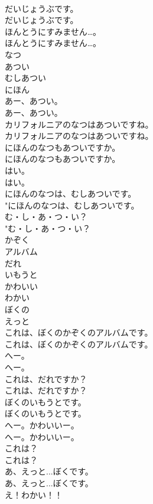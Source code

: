 \documentclass[8pt]{extreport}
\begin{document}
\begin{CJK}{UTF8}{min}
\\	だいじょうぶです。	
\\	だいじょうぶです。 
\\	ほんとうにすみません…。	
\\	ほんとうにすみません…。 
\\	なつ
\\	あつい
\\	むしあつい
\\	にほん
\\	あー、あつい。	
\\	あー、あつい。 
\\	カリフォルニアのなつはあついですね。	
\\	カリフォルニアのなつはあついですね。 
\\	にほんのなつもあついですか。	
\\	にほんのなつもあついですか。 
\\	はい。	
\\	はい。 
\\	にほんのなつは、むしあついです。	
\\	"にほんのなつは、むしあついです。 
\\	む・し・あ・つ・い？	
\\	"む・し・あ・つ・い？ 
\\	かぞく
\\	アルバム
\\	だれ
\\	いもうと
\\	かわいい
\\	わかい
\\	ぼくの
\\	えっと
\\	これは、ぼくのかぞくのアルバムです。	
\\	これは、ぼくのかぞくのアルバムです。 
\\	へー。
\\	へー。
\\	これは、だれですか？	
\\	これは、だれですか？ 
\\	ぼくのいもうとです。	
\\	ぼくのいもうとです。 
\\	へー。かわいいー。	
\\	へー。かわいいー。 
\\	これは？	
\\	これは？ 
\\	あ、えっと...ぼくです。	
\\	あ、えっと...ぼくです。 
\\	え！わかい！！	

\end{CJK}
\end{document}
